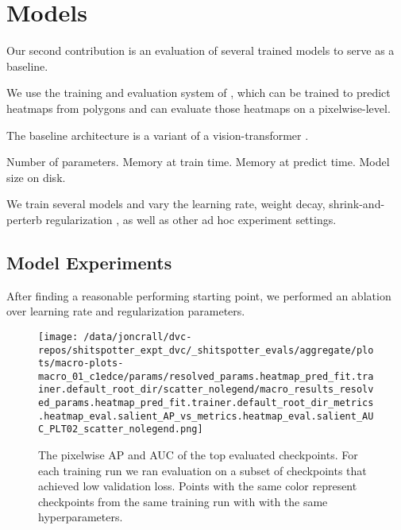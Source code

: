 \documentclass[10pt,twocolumn,letterpaper]{article}
\begin{document}
\section{Models}

Our second contribution is an evaluation of several trained models to serve as
a baseline.

We use the training and evaluation system of \cite{Greenwell_2024_WACV}, which
can be trained to predict heatmaps from polygons and can evaluate those
heatmaps on a pixelwise-level. 

The baseline architecture is a variant of a vision-transformer \cite{vit,split-attention,greenwell_watch_2024}.

Number of parameters.
Memory at train time.
Memory at predict time.
Model size on disk.

We train several models and vary the learning rate, weight decay,
shrink-and-perterb regularization \cite{ash_warm_starting_2020}, as well as
other ad hoc experiment settings.

\subsection{Model Experiments}

\begin{comment}
    SeeAlso:
    ~/code/shitspotter/experiments/run_pixel_eval_pipeline.sh

    ~/code/shitspotter/dev/poc/estimate_train_resources.py

\end{comment}

After finding a reasonable performing starting point, we performed an ablation
over learning rate and regularization parameters. 
\begin{figure}[h]
\centering

\texttt{[image: /data/joncrall/dvc-repos/shitspotter\_expt\_dvc/\_shitspotter\_evals/aggregate/plots/macro-plots-macro\_01\_c1edce/params/resolved\_params.heatmap\_pred\_fit.trainer.default\_root\_dir/scatter\_nolegend/macro\_results\_resolved\_params.heatmap\_pred\_fit.trainer.default\_root\_dir\_metrics.heatmap\_eval.salient\_AP\_vs\_metrics.heatmap\_eval.salient\_AUC\_PLT02\_scatter\_nolegend.png]}
\caption[]{
    The pixelwise AP and AUC of the top evaluated checkpoints.
    For each training run we ran evaluation on a subset of checkpoints that
    achieved low validation loss.
    Points with the same color represent checkpoints from the same training run
    with with the same hyperparameters.
}
\label{fig:apauc_scatter}
\end{figure}
\end{document}
